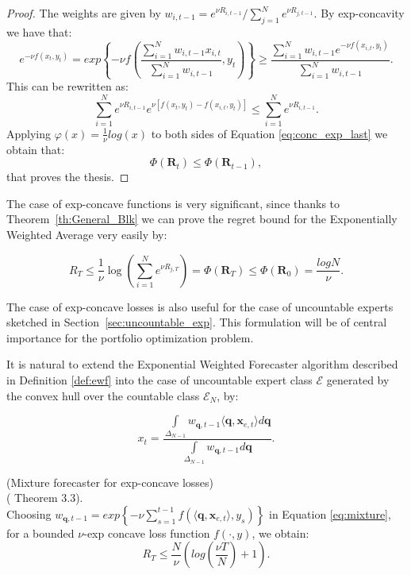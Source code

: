 \begin{proof}
    The weights are given by $w_{i,t-1}=e^{\nu R_{i,t-1}}/\sum\limits_{j=1}^N e^{\nu R_{j,t-1}}$.
    By exp-concavity we have that:
    \begin{equation}
        e^{-\nu f(x_t,y_t)}=exp\left\{-\nu f \left(\frac{\sum\limits_{i=1}^N w_{i,t-1}x_{i,t}}{\sum\limits_{i=1}^N w_{i,t-1}},y_t\right)\right\}\ge \frac{\sum\limits_{i=1}^N w_{i,t-1}e^{-\nu f(x_{i,t},y_t)}}{\sum\limits_{i=1}^N w_{i,t-1}}.
    \end{equation}
    This can be rewritten as:
    \begin{equation}\label{eq:conc_exp_last}
        \sum\limits_{i=1}^N e^{\nu R_{i,t-1}}e^{\nu [f(x_t,y_t)-f(x_{i,t},y_t)]}\le \sum\limits_{i=1}^N e^{\nu R_{i,t-1}}.
    \end{equation}
    Applying $\varphi(x)=\frac{1}{\nu}log(x)$ to both sides of Equation \eqref{eq:conc_exp_last} we obtain that: 
    $$\Phi(\mathbf R_{t})\le \Phi(\mathbf R_{t-1}),$$ that proves the thesis.
\end{proof}

The case of exp-concave functions is very significant, since thanks to Theorem~\ref{th:General_Blk} we can prove the regret bound for the Exponentially Weighted Average very easily by:

\begin{equation}\label{eq:regret_exp_finite}
    R_T\le \frac{1}{\nu}\log\left(\sum\limits_{i=1}^N e^{\nu R_{j,T}}\right)=\Phi(\mathbf R_T)\le\Phi(\mathbf R_0) = \frac{log N}{\nu}.
\end{equation}

The case of exp-concave losses is also useful for the case of uncountable experts sketched in Section~\ref{sec:uncountable_exp}. This formulation will be of central importance for the portfolio optimization problem.

It is natural to extend the Exponential Weighted Forecaster algorithm described in Definition \eqref{def:ewf} into the case of uncountable expert class $\mathcal E$ generated by the convex hull over the countable class $\mathcal E_N$, by:

\begin{equation}\label{eq:mixture}
    x_t=\frac{\int\limits_{\Delta_{N-1}} w_{\mathbf q,t-1}\langle \mathbf q, \mathbf x_{e,t}\rangle d\mathbf q}{\int\limits_{\Delta_{N-1}} w_{\mathbf q,t-1}d\mathbf q}.
\end{equation}

\begin{theorem}(Mixture forecaster for exp-concave losses)\\
(\cite{cesa2006prediction} Theorem 3.3).\label{th:mixture_forecaster}\\
    Choosing $w_{\mathbf q,t-1}=exp\left\{-\nu\sum\limits_{s=1}^{t-1}f(\langle \mathbf q,\mathbf x_{e,t}\rangle,y_s)\right\}$ in Equation \eqref{eq:mixture}, for a bounded $\nu$-exp concave loss function $f(\cdot,y)$, we obtain:
    $$R_T\le \frac{N}{\nu}\left(log\left(\frac{\nu T}{N}\right)+1\right).$$
\end{theorem}

